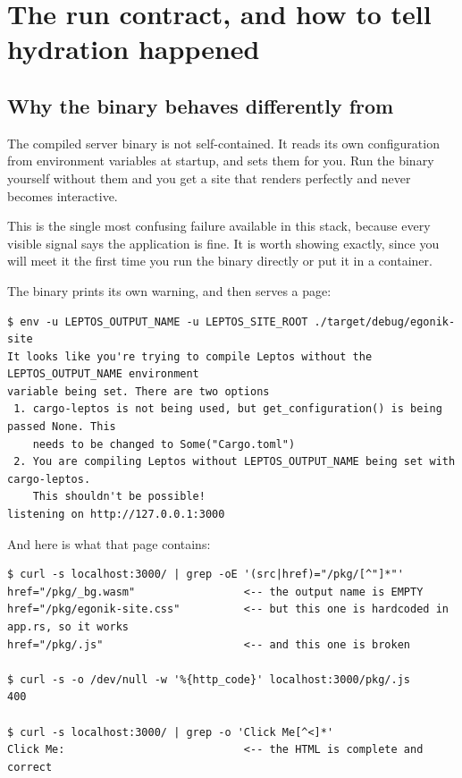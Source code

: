 \chapter{The run contract, and how to tell hydration happened}
\label{ch:runcontract}

\section{Why the binary behaves differently from }

\begin{keyidea}
The compiled server binary is not self-contained. It reads its own configuration from
 environment variables at startup, and  sets them for you. Run
the binary yourself without them and you get a site that renders perfectly and never becomes
interactive.
\end{keyidea}

This is the single most confusing failure available in this stack, because every visible signal says
the application is fine. It is worth showing exactly, since you will meet it the first time you run
the binary directly or put it in a container.

\begin{verified}
The binary prints its own warning, and then serves a page:
\begin{lstlisting}[style=out]
$ env -u LEPTOS_OUTPUT_NAME -u LEPTOS_SITE_ROOT ./target/debug/egonik-site
It looks like you're trying to compile Leptos without the LEPTOS_OUTPUT_NAME environment
variable being set. There are two options
 1. cargo-leptos is not being used, but get_configuration() is being passed None. This
    needs to be changed to Some("Cargo.toml")
 2. You are compiling Leptos without LEPTOS_OUTPUT_NAME being set with cargo-leptos.
    This shouldn't be possible!
listening on http://127.0.0.1:3000
\end{lstlisting}

And here is what that page contains:
\begin{lstlisting}[style=out]
$ curl -s localhost:3000/ | grep -oE '(src|href)="/pkg/[^"]*"'
href="/pkg/_bg.wasm"                 <-- the output name is EMPTY
href="/pkg/egonik-site.css"          <-- but this one is hardcoded in app.rs, so it works
href="/pkg/.js"                      <-- and this one is broken

$ curl -s -o /dev/null -w '%{http_code}' localhost:3000/pkg/.js
400

$ curl -s localhost:3000/ | grep -o 'Click Me[^<]*'
Click Me:                            <-- the HTML is complete and correct
\end{lstlisting}
\end{verified}

